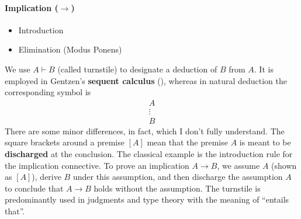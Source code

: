 \paragraph{Implication ($\to$)}
\begin{itemize}
  \item Introduction
        \begin{prooftree}
        \end{prooftree}
  \item Elimination (Modus Ponens)
        \begin{prooftree}
        \end{prooftree}
\end{itemize}

\begin{notation}
  We use $A \vdash B$ (called turnstile) to designate a deduction of $B$ from $A$.
  It is employed in Gentzen’s \textbf{sequent calculus} (\cite{girard1989proofs}),
  whereas in natural deduction the corresponding symbol is
  $$
    \begin{array}{c}
      A      \\
      \vdots \\
      B
    \end{array}
  $$
  There are some minor differences, in fact, which I don't fully understand.
  The square brackets around a premise $[A]$ mean that the premise $A$ is meant to
  be \textbf{discharged} at the conclusion. The classical example is the
  introduction rule for the implication connective.
  To prove an implication $A \to B$, we assume $A$
  (shown as $[A]$), derive $B$ under this assumption, and then discharge the
  assumption $A$ to conclude that $A \to B$ holds without the assumption.
  The turnstile is predominantly used in judgments and type theory with
  the meaning of ``entails that''.
\end{notation}

